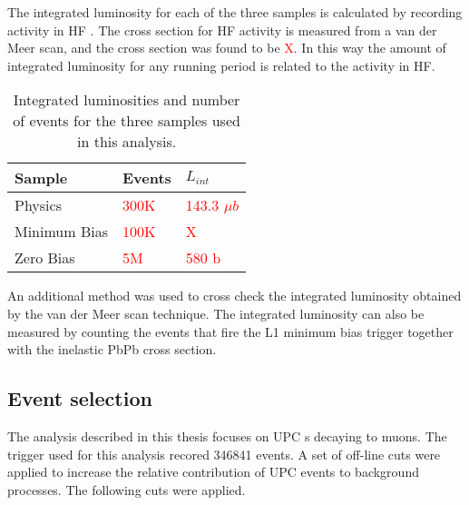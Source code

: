       The integrated luminosity for each of the three samples is calculated
      by recording activity in HF \DIFaddbegin {}\DIFaddend . 
      The cross section for HF activity is measured from a van der Meer scan, 
        and the cross section was found to be \textcolor{red}{X}.
      In this way the amount of integrated luminosity for any running period is
        related to the activity in HF. 
      \begin{table}
  	    \centering
  	    \begin{tabular}{|l|l|l|}
  	      \hline Sample & Events & $L_{int}$ \\ \hline \hline
  	      Physics & \textcolor{red}{300K} & \textcolor{red}{143.3 
  	        $\mu$$b$} \\ \hline
  	      Minimum Bias & \textcolor{red}{100K} & \textcolor{red}{X} \\ \hline
  	      Zero Bias & \textcolor{red}{5M} & \textcolor{red}{580 b} \\ \hline \hline
  	    \end{tabular}
  	    \caption{Integrated luminosities and number of events for the three
  	      samples used in this analysis.}
  	    \label{tab:sampleLumiNevt}
      \end{table}
      An additional method was used to cross check the integrated luminosity 
        obtained by the van der Meer scan technique.
      The integrated luminosity can also be measured by counting the events that
        fire the L1 minimum bias trigger together with the inelastic PbPb cross 
        section. 

    \subsection{Event selection}
      The analysis described in this thesis focuses on UPC \DIFdelbegin {}\DIFdelend \DIFaddbegin {}\DIFaddend s decaying to 
        muons. 
      The trigger used for this analysis recored 346841 events.
      A set of off-line cuts were applied to increase the relative contribution 
        of UPC events to background processes. 
      The following cuts were applied. 

